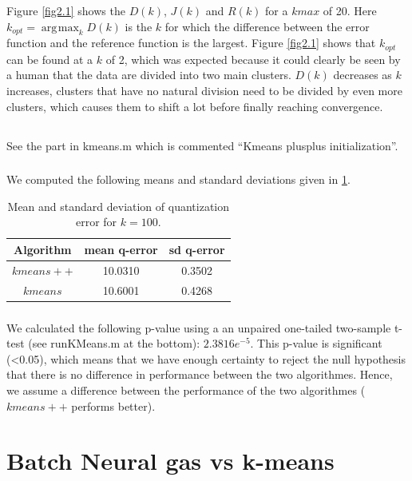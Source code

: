 \documentclass[10pt]{article}
\DeclareMathOperator*{\argmax}{arg\!\max}
\begin{document}
\noindent Figure \ref{fig2.1} shows the $D(k)$, $J(k)$ and $R(k)$ for a $kmax$ of 20. Here $k_{opt} = \argmax_k D(k)$ is the $k$ for which the difference between the error function and the reference function is the largest. Figure \ref{fig2.1} shows that $k_{opt}$ can be found at a $k$ of 2, which was expected because it could clearly be seen by a human that the data are divided into two main clusters. $D(k)$ decreases as $k$ increases, clusters that have no natural division need to be divided by even more clusters, which causes them to shift a lot before finally reaching convergence.

\subsection{}
\subsubsection{}
See the part in kmeans.m which is commented ``Kmeans plusplus initialization''.

\subsubsection{}
We computed the following means and standard deviations given in \ref{tab1}.
\begin{table}[H]
 \centering
 \caption{Mean and standard deviation of quantization error for $k = 100$.}
 \begin{tabular}{c|c|c}
  Algorithm & mean q-error & sd q-error \\
  \hline
  $kmeans++$ & 10.0310 & 0.3502 \\
  $kmeans$ & 10.6001 & 0.4268 
 \end{tabular}
 \label{tab1}
\end{table}

\subsubsection{}
We calculated the following p-value using a an unpaired one-tailed two-sample t-test (see runKMeans.m at the bottom): $2.3816e^{-5}$. This p-value is significant (<0.05), which means that we have enough certainty to reject the null hypothesis that there is no difference in performance between the two algorithmes. Hence, we assume a difference between the performance of the two algorithmes ($kmeans++$ performs better).

\section{Batch Neural gas vs k-means}
\end{document}
